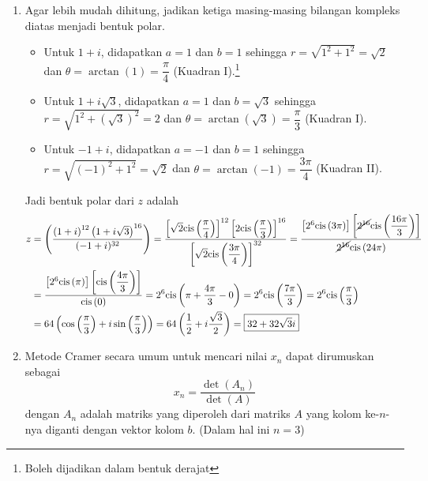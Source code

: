 \documentclass[10pt,openany,a4paper]{article}
\newcommand{\cis}{\text{cis}}
\begin{document}
\begin{enumerate}
        \item Agar lebih mudah dihitung, jadikan ketiga masing-masing bilangan kompleks diatas menjadi bentuk polar.
        \begin{itemize}
            \item Untuk $1+i$, didapatkan $a=1$ dan $b=1$ sehingga $r=\sqrt{1^2+1^2}=\sqrt{2}$ dan $\theta=\arctan\left(1\right)=\dfrac{\pi}{4}$ (Kuadran I).\footnote{Boleh dijadikan dalam bentuk derajat}
            \item Untuk $1+i\sqrt{3}$, didapatkan $a=1$ dan $b=\sqrt{3}$ sehingga $r=\sqrt{1^2+(\sqrt{3})^2}=2$ dan $\theta=\arctan\left(\sqrt{3}\right)=\dfrac{\pi}{3}$ (Kuadran I).
            \item Untuk $-1+i$, didapatkan $a=-1$ dan $b=1$ sehingga $r=\sqrt{(-1)^2+1^2}=\sqrt{2}$ dan $\theta=\arctan\left(-1\right)=\dfrac{3\pi}{4}$ (Kuadran II).
        \end{itemize}
        Jadi bentuk polar dari $z$ adalah
        \begin{align*}
            z&=\left(\frac{\left(1 + i\right)^{12}\left(1 + i\sqrt{3}\right)^{16}}{(-1 + i)^{32}}\right)=\frac{\left[\sqrt{2}\cis\left(\dfrac{\pi}{4}\right)\right]^{12}\left[2\cis\left(\dfrac{\pi}{3}\right)\right]^{16}}{\left[\sqrt{2}\cis\left(\dfrac{3\pi}{4}\right)\right]^{32}}=\frac{\left[2^{6}\cis\left(3\pi\right)\right]\left[\cancel{2^{16}}\cis\left(\dfrac{16\pi}{3}\right)\right]}{\cancel{2^{16}}\cis\left(24\pi\right)}\\
            &=\frac{\left[2^{6}\cis\left(\pi\right)\right]\left[\cis\left(\dfrac{4\pi}{3}\right)\right]}{\cis\left(0\right)}=2^{6}\cis\left(\pi+\dfrac{4\pi}{3}-0\right)=2^{6}\cis\left(\dfrac{7\pi}{3}\right)=2^{6}\cis\left(\dfrac{\pi}{3}\right)\\
            &=64\left(\cos\left(\dfrac{\pi}{3}\right)+i\sin\left(\dfrac{\pi}{3}\right)\right)=64\left(\dfrac{1}{2}+i\dfrac{\sqrt{3}}{2}\right)=\boxed{32+32\sqrt{3}i}
        \end{align*}
        \item Metode Cramer secara umum untuk mencari nilai $x_n$ dapat dirumuskan sebagai
        \[x_n=\frac{\det(A_n)}{\det(A)}\]
        dengan $A_n$ adalah matriks yang diperoleh dari matriks $A$ yang kolom ke-$n$-nya diganti dengan vektor kolom $b$. (Dalam hal ini $n=3$)


\end{enumerate}
\end{document}
